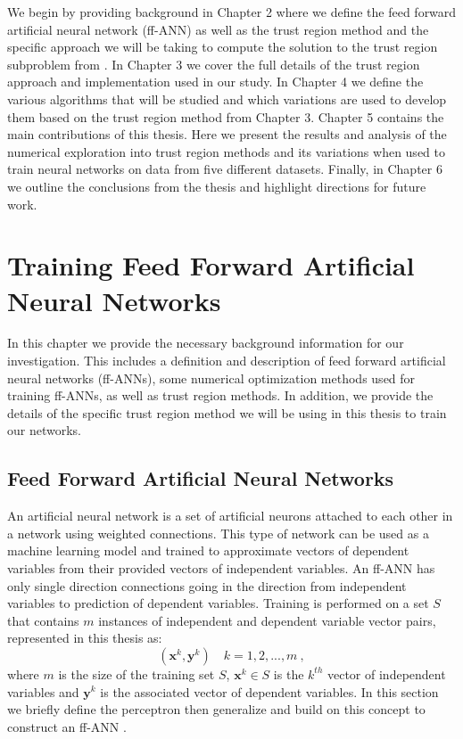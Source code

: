 \documentclass[letterpaper,12pt,titlepage,oneside,final]{book}
\begin{document}
	We begin by providing background in Chapter 2 where we define the feed forward artificial neural network (ff-ANN) as well as the trust region method and the specific approach we will be taking to compute the solution to the trust region subproblem from \cite{adachi.paper}. In Chapter 3 we cover the full details of the trust region approach and implementation used in our study. In Chapter 4 we define the various algorithms that will be studied and which variations are used to develop them based on the trust region method from Chapter 3. Chapter 5 contains the main contributions of this thesis. Here we present the results and analysis of the numerical exploration into trust region methods and its variations when used to train neural networks on data from five different datasets. Finally, in Chapter 6 we outline the conclusions from the thesis and highlight directions for future work. 
	
	
	\chapter{Training Feed Forward Artificial Neural Networks}
	
	In this chapter we provide the necessary background information for our investigation. This includes a definition and description of feed forward artificial neural networks (ff-ANNs), some numerical optimization methods used for training ff-ANNs, as well as trust region methods. In addition, we provide the details of the specific trust region method we will be using in this thesis to train our networks.
	
	\section{Feed Forward Artificial Neural Networks}
	An artificial neural network is a set of artificial neurons attached to each other in a network using weighted connections. This type of network can be used as a machine learning model and trained to approximate vectors of dependent variables from their provided vectors of independent variables. An ff-ANN has only single direction connections going in the direction from independent variables to prediction of dependent variables. Training is performed on a set $S$ that contains $m$ instances of independent and dependent variable vector pairs, represented in this thesis as:
	\begin{equation}
	(\mathbf{x}^{k},\mathbf{y}^{k}) \quad  k = 1,2, ..., m \ , 
	\label{equation:training_example}
	\end{equation} 
	where $m$ is the size of the training set $S$, $\mathbf{x}^{k} \in S$ is the $k^{th}$ vector of independent variables and $\mathbf{y}^{k}$ is the associated vector of dependent variables. In this section we briefly define the perceptron then generalize and build on this concept to construct an ff-ANN .
	
\end{document}
